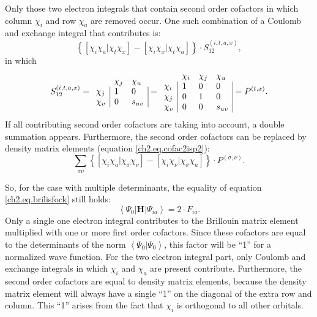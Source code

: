 Only those two electron integrals that contain second order cofactors in which column $\chi_i$ and row $\chi_a$ are removed occur. One such combination of a Coulomb and exchange integral that contributes is: 
\begin{equation}
\left\{ [\chi_i\chi_a|\chi_t\chi_x] - [\chi_i\chi_x|\chi_t\chi_a] \right\} \cdot S_{12}^{(i,t,a,x)},
\label{ch2.eq.twoelexamp2}
\end{equation}
in which
\begin{equation}
S_{12}^{(i,t,a,x)}= 
\begin{array}{lll}
 &  \chi_j & \chi_u \\
 \chi_j & \multicolumn{1}{|l}{ 1 } & \multicolumn{1}{l|}{ 0 } \\
 \chi_v & \multicolumn{1}{|l}{ 0 } & \multicolumn{1}{l|}{ s_{uv} }
\end{array}=
\begin{array}{llll}
 &  \chi_i & \chi_j & \chi_u \\
 \chi_i & \multicolumn{1}{|l}{ 1 } & 0 & \multicolumn{1}{l|}{ 0 } \\
 \chi_j & \multicolumn{1}{|l}{ 0 } & 1 & \multicolumn{1}{l|}{ 0 } \\
 \chi_v & \multicolumn{1}{|l}{ 0 } & 0 & \multicolumn{1}{l|}{ s_{uv} }
\end{array}=
P^{(t,x)}.
\label{ch2.eq.cofac2isp2}
\end{equation}
If all contributing second order cofactors are taking into account, a double summation appears. Furthermore, the second order cofactors can be replaced by density matrix elements (equation \ref{ch2.eq.cofac2isp2}):
\begin{equation}
\sum_{\sigma\nu} \left\{ [\chi_i\chi_a|\chi_\sigma\chi_\nu] - [\chi_i\chi_\nu|\chi_\sigma\chi_a] \right\} \cdot P^{(\sigma,\nu)}.
\label{ch2.eq.twoel_ia_tot2}
\end{equation}

So, for the case with multiple determinants, the equality of equation \ref{ch2.eq.brilisfock} still holds:
\begin{equation}
\left<\Psi_0 | \mathbf{H} | \Psi_{ia} \right> = 2 \cdot F_{ia}.
\label{ch2.eq.fiafinal}
\end{equation}
Only a single one electron integral contributes to the Brillouin matrix element multiplied with one or more first order cofactors. Since these cofactors are equal to the determinants of the norm $\left< \Psi_0 | \Psi_0 \right>$, this factor will be ``1'' for a normalized wave function. For the two electron integral part, only Coulomb and exchange integrals in which $\chi_i$ and $\chi_a$ are present contribute. Furthermore, the second order cofactors are equal to density matrix elements, because the density matrix element will always have a single ``1'' on the diagonal of the extra row and column. This ``1'' arises from the fact that $\chi_i$ is orthogonal to all other orbitals.

